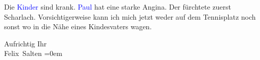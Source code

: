 \pstart
           Die \textcolor{blue}{Kinder}{}\ledrightnote{{$\rightarrow$}\textcolor{blue}{Anna Katharina Rehmann}} sind krank. \textcolor{blue}{Paul}{}\ledrightnote{\textcolor{blue}{Paul Salten}} hat eine starke Angina. Der \label{K_L03435-3v}\label{K_L03435-3h} fürchtete zuerst
               Scharlach. Vorsichtigerweise kann ich mich jetzt weder auf dem Tennisplatz noch sonst
               wo in die Nähe eines Kindesvaters wagen.\pend
           
\pstart
           Aufrichtig Ihr {\\[\baselineskip]}\spacefill\mbox{Felix Salten}\pend
           \leftskip=0em{}\endnumbering{}  
      
